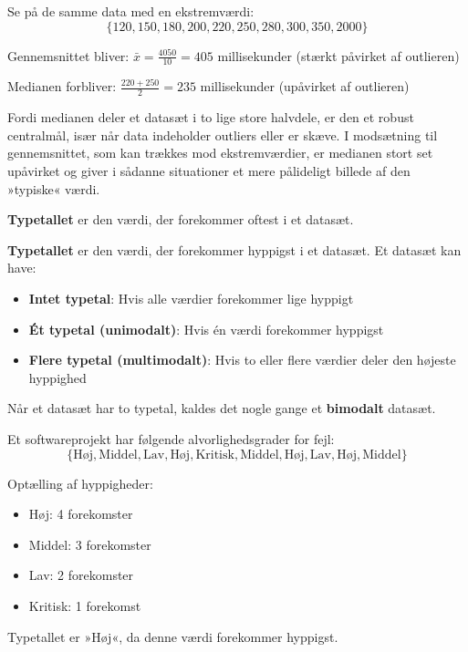 \begin{example}

Se på de samme data med en ekstremværdi:
\[
\{120, 150, 180, 200, 220, 250, 280, 300, 350, 2000\}
\]

Gennemsnittet bliver: $\bar{x} = \frac{4050}{10} = 405$ millisekunder (stærkt påvirket af outlieren)

Medianen forbliver: $\frac{220 + 250}{2} = 235$ millisekunder (upåvirket af outlieren)
\end{example}

Fordi medianen deler et datasæt i to lige store halvdele, er den et robust centralmål, især når data indeholder outliers eller er skæve. I modsætning til gennemsnittet, som kan trækkes mod ekstremværdier, er medianen stort set upåvirket og giver i sådanne situationer et mere pålideligt billede af den »typiske« værdi.

\textbf{Typetallet} er den værdi, der forekommer oftest i et datasæt.

\begin{definition}[Typetal]
\textbf{Typetallet} er den værdi, der forekommer hyppigst i et datasæt. Et datasæt kan have:
\begin{itemize}
    \item \textbf{Intet typetal}: Hvis alle værdier forekommer lige hyppigt
    \item \textbf{Ét typetal (unimodalt)}: Hvis én værdi forekommer hyppigst
    \item \textbf{Flere typetal (multimodalt)}: Hvis to eller flere værdier deler den højeste hyppighed
\end{itemize}
\end{definition}

Når et datasæt har to typetal, kaldes det nogle gange et \textbf{bimodalt} datasæt.

\newpage

\begin{example}

Et softwareprojekt har følgende alvorlighedsgrader for fejl:
\[
\{\text{Høj}, \text{Middel}, \text{Lav}, \text{Høj}, \text{Kritisk}, \text{Middel}, \text{Høj}, \text{Lav}, \text{Høj}, \text{Middel}\}
\]

Optælling af hyppigheder:
\begin{itemize}
    \item Høj: 4 forekomster
    \item Middel: 3 forekomster  
    \item Lav: 2 forekomster
    \item Kritisk: 1 forekomst
\end{itemize}

Typetallet er »Høj«, da denne værdi forekommer hyppigst.
\end{example}

